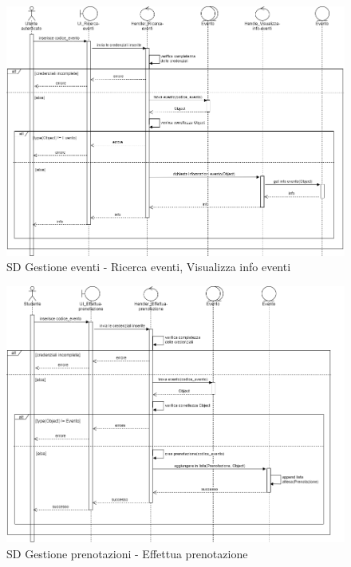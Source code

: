 \documentclass[11pt]{article}
\begin{document}
\begin{figure}[H]
\centering
\includegraphics[width=1\textwidth]{SD Gestione eventi - Ricerca eventi, Visualizza info eventi.png}
\caption{SD Gestione eventi - Ricerca eventi, Visualizza info eventi}
\end{figure}

\begin{figure}[H]
\centering
\includegraphics[width=1\textwidth]{SD Gestione prenotazioni - Effettua prenotazione.png}
\caption{SD Gestione prenotazioni - Effettua prenotazione}
\end{figure}
\end{document}
